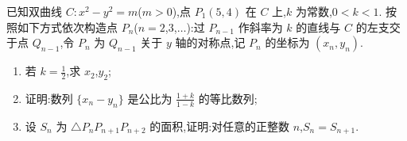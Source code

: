 \begin{problem}
已知双曲线 \(C:x^2-y^2=m\)(\(m>0\)),点 \(P_1(5,4)\) 在 \(C\) 上,\(k\) 为常数,\(0<k<1\). 按照如下方式依次构造点 \(P_n\)(\(n=2\),\(3\),\(\dots\)):过 \(P_{n-1}\) 作斜率为 \(k\) 的直线与 \(C\) 的左支交于点 \(Q_{n-1}\),令 \(P_n\) 为 \(Q_{n-1}\) 关于 \(y\) 轴的对称点,记 \(P_n\) 的坐标为 \((x_n,y_n)\).
\begin{enumerate}
\item 若 \(k=\frac12\),求 \(x_2\),\(y_2\);
\item 证明:数列 \(\{x_n-y_n\}\) 是公比为 \(\frac{1+k}{1-k}\) 的等比数列;
\item 设 \(S_n\) 为 \(\triangle P_nP_{n+1}P_{n+2}\) 的面积,证明:对任意的正整数 \(n\),\(S_n=S_{n+1}\).
\end{enumerate}
\end{problem}

